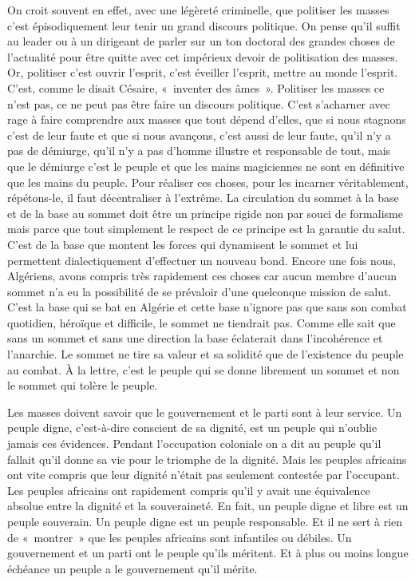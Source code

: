 \documentclass[french,twoside]{book} %
\begin{document}
On croit souvent en effet, avec une légèreté criminelle, que politiser les masses c’est épisodiquement leur tenir un grand discours politique. On pense qu’il suffit au leader ou à un dirigeant de parler sur un ton doctoral des grandes choses de l’actualité pour être quitte avec cet impérieux devoir de politisation des masses. Or, politiser c’est ouvrir l’esprit, c’est éveiller l’esprit, mettre au monde l’esprit. C’est, comme le disait Césaire, « inventer des âmes ». Politiser les masses ce n’est pas, ce ne peut pas être faire un discours politique. C’est s’acharner avec rage à faire comprendre aux masses que tout dépend d’elles, que si nous stagnons c’est de leur faute et que si nous avançons, c’est aussi de leur faute, qu’il n’y a pas de démiurge, qu’il n’y a pas d’homme illustre et responsable de tout, mais que le démiurge c’est le peuple et que les mains magiciennes ne sont en définitive que les mains du peuple. Pour réaliser ces choses, pour les incarner véritablement, répétons-le, il faut décentraliser à l’extrême. La circulation du sommet à la base et de la base au sommet doit être un principe rigide non par souci de formalisme mais parce que tout simplement le respect de ce principe est la garantie du salut. C’est de la base que montent les forces qui dynamisent le sommet et lui permettent dialectiquement   d’effectuer un nouveau bond. Encore une fois nous, Algériens, avons compris très rapidement ces choses car aucun membre d’aucun sommet n’a eu la possibilité de se prévaloir d’une quelconque mission de salut. C’est la base qui se bat en Algérie et cette base n’ignore pas que sans son combat quotidien, héroïque et difficile, le sommet ne tiendrait pas. Comme elle sait que sans un sommet et sans une direction la base éclaterait dans l’incohérence et l’anarchie. Le sommet ne tire sa valeur et sa solidité que de l’existence du peuple au combat. À la lettre, c’est le peuple qui se donne librement un sommet et non le sommet qui tolère le peuple.\par
\bigbreak
\noindent Les masses doivent savoir que le gouvernement et le parti sont à leur service. Un peuple digne, c’est-à-dire conscient de sa dignité, est un peuple qui n’oublie jamais ces évidences. Pendant l’occupation coloniale on a dit au peuple qu’il fallait qu’il donne sa vie pour le triomphe de la dignité. Mais les peuples africains ont vite compris que leur dignité n’était pas seulement contestée par l’occupant. Les peuples africains ont rapidement compris qu’il y avait une équivalence absolue entre la dignité et la souveraineté. En fait, un peuple digne et libre est un peuple souverain. Un peuple digne est un peuple responsable. Et il ne sert à rien de « montrer » que les peuples africains sont infantiles ou débiles. Un gouvernement et un parti ont le peuple qu’ils méritent. Et à plus ou moins longue échéance un peuple a le gouvernement qu’il mérite.\par
\end{document}
